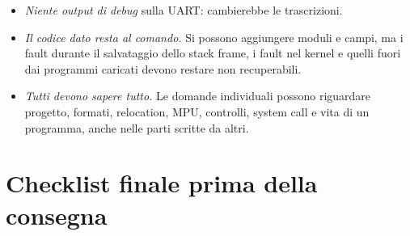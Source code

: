 \begin{itemize}
\item \emph{Niente output di debug} sulla UART: cambierebbe le trascrizioni.
\item \emph{Il codice dato resta al comando.} Si possono aggiungere moduli e campi, ma i fault durante il salvataggio dello stack frame, i fault nel kernel e quelli fuori dai programmi caricati devono restare non recuperabili.
\item \emph{Tutti devono sapere tutto.} Le domande individuali possono riguardare progetto, formati, relocation, MPU, controlli, system call e vita di un programma, anche nelle parti scritte da altri.
\end{itemize}

\section{Checklist finale prima della consegna}

